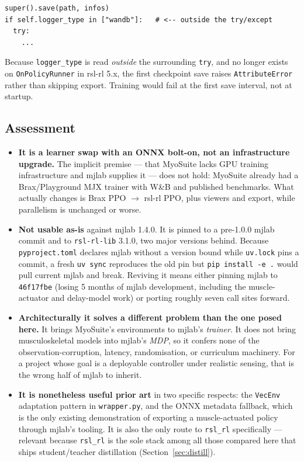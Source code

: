 \documentclass[11pt,a4paper]{article}
\begin{document}
\begin{lstlisting}
super().save(path, infos)
if self.logger_type in ["wandb"]:   # <-- outside the try/except
  try:
    ...
\end{lstlisting}

\noindent
Because \texttt{logger\_type} is read \emph{outside} the surrounding
\texttt{try}, and no longer exists on \texttt{OnPolicyRunner} in rsl-rl 5.x, the first
checkpoint save raises \texttt{AttributeError} rather than skipping export. Training would
fail at the first save interval, not at startup.

\subsection{Assessment}

\begin{itemize}[leftmargin=1.4em,itemsep=0.3em]
\item \textbf{It is a learner swap with an ONNX bolt-on, not an infrastructure upgrade.}
The implicit premise --- that MyoSuite lacks GPU training infrastructure and mjlab supplies
it --- does not hold: MyoSuite already had a Brax/Playground MJX trainer with W\&B and
published benchmarks. What actually changes is Brax PPO $\to$ rsl-rl PPO, plus viewers and
export, while parallelism is unchanged or worse.

\item \textbf{Not usable as-is} against mjlab 1.4.0. It is pinned to a pre-1.0.0 mjlab
commit and to \texttt{rsl-rl-lib} 3.1.0, two major versions behind. Because
\texttt{pyproject.toml} declares mjlab without a version bound while \texttt{uv.lock}
pins a commit, a fresh \texttt{uv sync} reproduces the old pin but \texttt{pip install -e .}
would pull current mjlab and break. Reviving it means either pinning mjlab to
\texttt{46f17fbe} (losing 5 months of mjlab development, including the muscle-actuator and
delay-model work) or porting roughly seven call sites forward.

\item \textbf{Architecturally it solves a different problem than the one posed here.} It
brings MyoSuite's environments to mjlab's \emph{trainer}. It does not bring musculoskeletal
models into mjlab's \emph{MDP}, so it confers none of the observation-corruption,
latency, randomisation, or curriculum machinery. For a project whose goal is a deployable
controller under realistic sensing, that is the wrong half of mjlab to inherit.

\item \textbf{It is nonetheless useful prior art} in two specific respects: the
\texttt{VecEnv} adaptation pattern in \texttt{wrapper.py}, and the ONNX metadata fallback,
which is the only existing demonstration of exporting a muscle-actuated policy through
mjlab's tooling. It is also the only route to \texttt{rsl\_rl} specifically --- relevant
because \texttt{rsl\_rl} is the sole stack among all those compared here that ships
student/teacher distillation (Section~\ref{sec:distill}).


\end{itemize}
\end{document}
